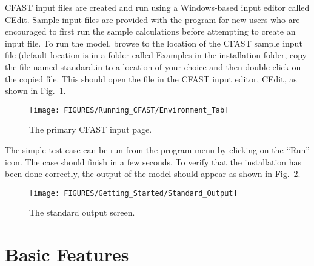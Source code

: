 CFAST input files are created and run using a Windows-based input editor called CEdit. Sample input files are provided with the program for new users who are encouraged to first run the sample calculations before attempting to create an input file. To run the model, browse to the location of the CFAST sample input file (default location is in a folder called {\ct Examples} in the installation folder, copy the file named {\ct standard.in} to a location of your choice and then double click on the copied file. This should open the file in the CFAST input editor, CEdit, as shown in Fig.~\ref{primary_screen}.
\begin{figure}[h!]
\texttt{[image: FIGURES/Running\_CFAST/Environment\_Tab]}
\caption[The primary CFAST input page]{The primary CFAST input page.}
\label{primary_screen}
\end{figure}
The simple test case can be run from the program menu by clicking on the ``Run'' icon. The case should finish in a few seconds. To verify that the installation has been done correctly, the output of the model should appear as shown in Fig.~\ref{Run_Model}.
\begin{figure}[h!]
\texttt{[image: FIGURES/Getting\_Started/Standard\_Output]}
\caption[The standard output screen]{The standard output screen.}
\label{Run_Model}
\end{figure}


\section{Basic Features}

